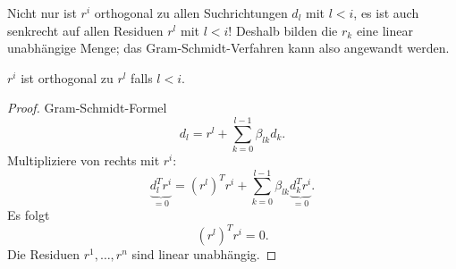 \bigskip

Nicht nur ist $r^i$ orthogonal zu allen Suchrichtungen $d_l$ mit $l<i$, es ist auch senkrecht
auf allen Residuen $r^l$ mit $l<i$!  Deshalb bilden die $r_k$ eine linear unabhängige Menge;
das Gram-Schmidt-Verfahren kann also angewandt werden.

\begin{lemma}
\label{lem:orthogonal_residuals}
$r^i$ ist orthogonal zu $r^l$ falls $l<i$.
\end{lemma}
\begin{proof}
Gram-Schmidt-Formel
\begin{equation*}
 d_l=r^l+\sum_{k=0}^{l-1} \beta_{lk}d_k.
\end{equation*}
Multipliziere von rechts mit $r^i$:
\begin{equation*}
 \underbrace{d_l^Tr^i}_{=0}
 =
 (r^l)^T r^i+\sum_{k=0}^{l-1} \beta_{lk} \underbrace{d_k^Tr^i}_{=0}.
\end{equation*}
Es folgt
\begin{equation*}
 (r^l)^T r^i = 0.
\end{equation*}
Die Residuen $r^1,\ldots,r^n$ sind linear unabhängig.
\end{proof}

